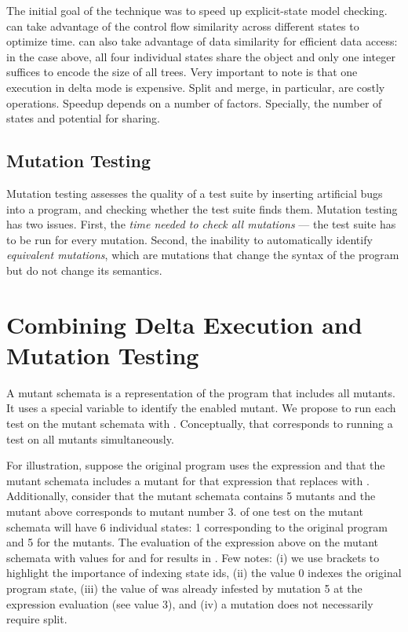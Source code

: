\documentclass[10pt]{article}
\begin{document}
The initial goal of the technique was to speed up explicit-state model
checking.  \DEA{} can take advantage of the control flow similarity
across different states to optimize time.  \DEA{} can also take
advantage of data similarity for efficient data access: in the case
above, all four individual states share the  object and
only one integer suffices to encode the size of all trees.  Very
important to note is that one execution in delta mode is expensive.
Split and merge, in particular, are costly operations.  Speedup
depends on a number of factors.  Specially, the number of states and
potential for sharing.

\subsection{Mutation Testing}
Mutation testing assesses the quality of a test suite by inserting
artificial bugs into a program, and checking whether the test suite
finds them.  Mutation testing has two issues.  First, the \emph{time
  needed to check all mutations} --- the test suite has to be run for
every mutation. Second, the inability to automatically identify
\emph{equivalent mutations}, which are mutations that change the
syntax of the program but do not change its semantics.


\section{Combining Delta Execution and Mutation Testing}

A mutant schemata is a representation of the program that includes all mutants.
It uses a special variable to identify the
enabled mutant. We propose to run each test on the mutant schemata with \DE{}.
Conceptually, that corresponds to running a test on all mutants simultaneously.

For illustration, suppose the original program uses the expression
 and that the mutant schemata includes a mutant for that
expression that replaces \CodeIn{>} with \CodeIn{<=}.  Additionally,
consider that the mutant schemata contains 5 mutants and the mutant
above corresponds to mutant number 3.  \DE{} of one test on the mutant
schemata will have 6 individual states: 1 corresponding to the
original program and 5 for the mutants.  The evaluation of the
expression above on the mutant schemata with values \CodeIn{[1]} for
 and \CodeIn{[2,2,2,2,2,3]} for  results in
\CodeIn{[f,f,f,t,f,f]}.  Few notes: (i) we use brackets to highlight
the importance of indexing state ids, (ii) the value 0 indexes the
original program state, (iii) the value of  was already
infested by mutation 5 at the expression evaluation (see value 3), and
(iv) a mutation does not necessarily require split.
\end{document}
